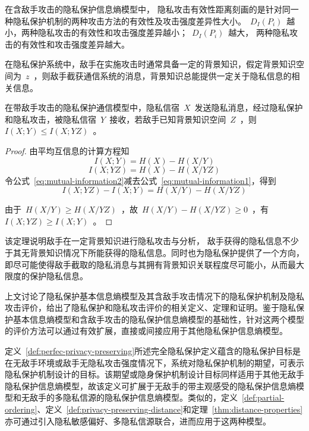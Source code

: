 在含敌手攻击的隐私保护信息熵模型中， 隐私攻击有效性距离刻画的是针对同一种隐私保护机制的两种攻击方法的有效性及攻击强度差异性大小。~$D_{I}(P_{i})$~越小，两种隐私攻击的有效性和攻击强度差异越小；~$D_{I}(P_{i})$~越大， 两种隐私攻击的有效性和攻击强度差异越大。

在隐私保护系统中，敌手在实施攻击时通常具备一定的背景知识，假定背景知识空间为~$z$~，则敌手截获通信系统的消息，背景知识总能提供一定关于隐私信息的相关信息。

\begin{theorem}
	\label{thm:privacy-attack-performance}
	在带敌手攻击的隐私保护通信模型中，隐私信宿~$X$~发送隐私消息，经过隐私保护和隐私攻击，被隐私信宿~$Y$~接收，若敌手已知背景知识空间~$Z$~，则~$I(X;Y)\leqslant I(X;YZ)$~。
\end{theorem} 

\begin{proof}
由平均互信息的计算方程知
\begin{equation}
\label{eq:mutual-information1}
I(X;Y) =H(X)-H(X/Y)
\end{equation}
\begin{equation}
\label{eq:mutual-information2}
I(X;YZ) =H(X)-H(X/YZ)
\end{equation}
令公式~\ref{eq:mutual-information2}减去公式~\ref{eq:mutual-information1}，得到
\begin{equation}
I(X;YZ)-I(X;Y) =H(X/Y)-H(X/YZ)
\end{equation}

由于~$H(X/Y) \geqslant H(X/YZ)$~，故~$H(X/Y)- H(X/YZ)\geqslant0$~，有~$I(X;YZ)\geqslant I(X;Y)$~。
\end{proof}

该定理说明敌手在一定背景知识进行隐私攻击与分析， 敌手获得的隐私信息不少于其无背景知识情况下所能获得的隐私信息。同时也为隐私保护提供了一个方向，即尽可能使得敌手截取的隐私消息与其拥有背景知识关联程度尽可能小，从而最大限度的保护隐私信息。


上文讨论了隐私保护基本信息熵模型及其含敌手攻击情况下的隐私保护机制及隐私攻击评价，给出了隐私保护和隐私攻击评价的相关定义、定理和证明。鉴于隐私保护基本信息熵模型和含敌手攻击的隐私保护信息熵模型的基础性，针对这两个模型的评价方法可以通过有效扩展，直接或间接应用于其他隐私保护信息熵模型。

定义~\ref{def:perfec-privacy-preserving}所述完全隐私保护定义蕴含的隐私保护目标是在无敌手环境或敌手无隐私攻击强度情况下，系统对隐私保护机制的期望，可表示隐私保护机制设计的目标。该期望或隐身保护机制设计目标同样适用于其他无敌手隐私保护信息熵模型，故该定义可扩展于无敌手的带主观感受的隐私保护信息熵模型和无敌手的多隐私信源的隐私保护信息熵模型。类似的，定义~\ref{def:partial-ordering}、定义~\ref{def:privacy-preserving-distance}和定理~\ref{thm:distance-properties}亦可通过引入隐私敏感偏好、多隐私信源联合，进而应用于这两种模型。

